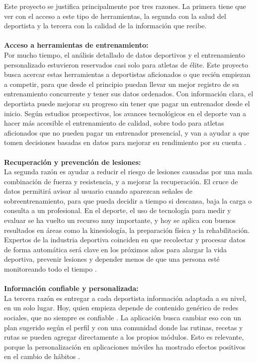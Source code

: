 Este proyecto se justifica principalmente por tres razones. La primera tiene que ver con el acceso a este tipo de herramientas, la segunda con la salud del deportista y la tercera con la calidad de la información que recibe.
\\\\
\textbf{Acceso a herramientas de entrenamiento:}\\
Por mucho tiempo, el análisis detallado de datos deportivos y el entrenamiento personalizado estuvieron reservados casi solo para atletas de élite. Este proyecto busca acercar estas herramientas a deportistas aficionados o que recién empiezan a competir, para que desde el principio puedan llevar un mejor registro de su entrenamiento concurrente y tener sus datos ordenados. Con información clara, el deportista puede mejorar su progreso sin tener que pagar un entrenador desde el inicio. Según estudios prospectivos, los avances tecnológicos en el deporte van a hacer más accesible el entrenamiento de calidad, sobre todo para atletas aficionados que no pueden pagar un entrenador presencial, y van a ayudar a que tomen decisiones basadas en datos para mejorar su rendimiento por su cuenta \citep{frevel2022impact}.
\\\\
\textbf{Recuperación y prevención de lesiones:}\\
La segunda razón es ayudar a reducir el riesgo de lesiones causadas por una mala combinación de fuerza y resistencia, y a mejorar la recuperación. El cruce de datos permitirá avisar al usuario cuando aparezcan señales de sobreentrenamiento, para que pueda decidir a tiempo si descansa, baja la carga o consulta a un profesional. En el deporte, el uso de tecnología para medir y evaluar se ha vuelto un recurso muy importante, y hoy se aplica con buenos resultados en áreas como la kinesiología, la preparación física y la rehabilitación. Expertos de la industria deportiva coinciden en que recolectar y procesar datos de forma automática será clave en los próximos años para alargar la vida deportiva, prevenir lesiones y depender menos de que una persona esté monitoreando todo el tiempo \citep{frevel2022impact}.
\\\\
\textbf{Información confiable y personalizada:}\\
La tercera razón es entregar a cada deportista información adaptada a su nivel, en un solo lugar. Hoy, quien empieza depende de contenido genérico de redes sociales, que no siempre es confiable \citep{sabbagh2020credibility}. La aplicación busca cambiar eso con un plan sugerido según el perfil y con una comunidad donde las rutinas, recetas y rutas se pueden agregar directamente a los propios módulos. Esto es relevante, porque la personalización en aplicaciones móviles ha mostrado efectos positivos en el cambio de hábitos \citep{tong2021personalized}.
